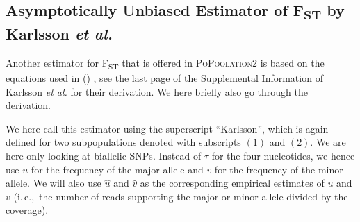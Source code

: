 \documentclass[a4paper,fontsize=9pt,DIV=14]{scrartcl}
\newcommand\toolname{\textsc}
\newcommand{\fst}{F\textsubscript{ST}}
\newcommand{\ie}{i.\,e.,~}
\newcommand\citeay[1]{\citeauthor{#1} (\citeyear{#1}) \cite{#1}}
\begin{document}



\subsection{Asymptotically Unbiased Estimator of \texorpdfstring{\fst}{FST} by Karlsson \textit{et al.}}
\label{supp:sec:FST:sub:Karlsson}

Another estimator for \fst{} that is offered in \toolname{PoPoolation2} is based on the equations used in \citeay{Karlsson2007}, see the last page of the Supplemental Information of Karlsson \textit{et al.} for their derivation.
We here briefly also go through the derivation.

We here call this estimator using the superscript ``Karlsson'', which is again defined for two subpopulations denoted with subscripts $(1)$ and $(2)$.
We are here only looking at biallelic SNPs.
Instead of $\tau$ for the four nucleotides, we hence use $u$ for the frequency of the major allele and $v$ for the frequency of the minor allele.  We will also use $\widehat{u}$ and $\widehat{v}$ as the corresponding empirical estimates of $u$ and $v$ (\ie the number of reads supporting the major or minor allele divided by the coverage).
\end{document}
